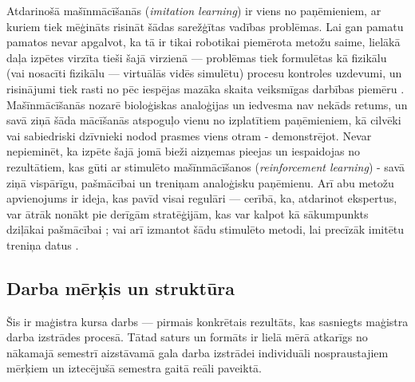 \documentclass[12pt, a4paper]{article}
\numberwithin{equation}{section} %
\begin{document}
Atdarinošā mašīnmācīšanās (\textit{imitation learning}) ir viens no paņēmieniem, ar kuriem tiek mēģināts risināt šādas sarežģītas vadības problēmas. Lai gan pamatu pamatos nevar apgalvot, ka tā ir tikai robotikai piemērota metožu saime, lielākā daļa izpētes virzīta tieši šajā virzienā --- problēmas tiek formulētas kā fizikālu (vai nosacīti fizikālu --- virtuālās vidēs simulētu) procesu kontroles uzdevumi, un risinājumi tiek rasti no pēc iespējas mazāka skaita veiksmīgas darbības piemēru \cite{attia2018global}. Mašīnmācīšanās nozarē bioloģiskas analoģijas un iedvesma nav nekāds retums, un savā ziņā šāda mācīšanās  atspoguļo vienu no izplatītiem paņēmieniem, kā cilvēki vai sabiedriski dzīvnieki nodod prasmes viens otram - demonstrējot. Nevar nepieminēt, ka izpēte šajā jomā bieži aizņemas pieejas un iespaidojas no rezultātiem, kas gūti ar stimulēto mašīnmācīšanos (\textit{reinforcement learning}) - savā ziņā vispārīgu, pašmācībai un treniņam analoģisku paņēmienu. Arī abu metožu apvienojums ir ideja, kas pavīd visai regulāri --- cerībā, ka, atdarinot ekspertus, var ātrāk nonākt pie derīgām stratēģijām, kas var kalpot kā sākumpunkts dziļākai pašmācībai \cite{hester2018deep}; vai arī izmantot šādu stimulēto metodi, lai precīzāk imitētu treniņa datus \cite{abbeel2004apprenticeship}.


\subsection{Darba mērķis un struktūra}

Šis ir maģistra kursa darbs --- pirmais konkrētais rezultāts, kas sasniegts maģistra darba izstrādes procesā. Tātad saturs un formāts ir lielā mērā atkarīgs no nākamajā semestrī aizstāvamā gala darba izstrādei individuāli nospraustajiem mērķiem un iztecējušā semestra gaitā reāli paveiktā. 
\end{document}
